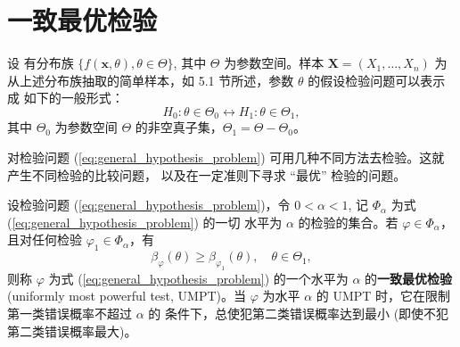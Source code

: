\section{一致最优检验}\label{sec:一致最优检验}
设 有分布族 $\{f(\mathbf{x}, \theta), \theta \in \Theta\}$, 其中 $\Theta$ 为参数空间。样本 $\mathbf{X}=(X_1, \dots, X_n)$ 为
从上述分布族抽取的简单样本，如 5.1 节所述，参数 $\theta$ 的假设检验问题可以表示成
如下的一般形式：
\begin{equation}
H_0: \theta \in \Theta_0 \leftrightarrow H_1: \theta \in \Theta_1, \label{eq:general_hypothesis_problem}
\end{equation}
其中 $\Theta_0$ 为参数空间 $\Theta$ 的非空真子集，$\Theta_1 = \Theta - \Theta_0$。

对检验问题 (\ref{eq:general_hypothesis_problem}) 可用几种不同方法去检验。这就产生不同检验的比较问题，
以及在一定准则下寻求 “最优” 检验的问题。

\begin{definition}\label{def:UMPT}
设检验问题 (\ref{eq:general_hypothesis_problem})，令 $0 < \alpha < 1$, 记 $\Phi_\alpha$ 为式 (\ref{eq:general_hypothesis_problem}) 的一切
水平为 $\alpha$ 的检验的集合。若 $\varphi \in \Phi_\alpha$，且对任何检验 $\varphi_1 \in \Phi_\alpha$，有
\begin{equation}
\beta_\varphi(\theta) \ge \beta_{\varphi_1}(\theta), \quad \theta \in \Theta_1, \label{eq:UMPT_condition}
\end{equation}
则称 $\varphi$ 为式 (\ref{eq:general_hypothesis_problem}) 的一个水平为 $\alpha$ 的\textbf{一致最优检验} (uniformly most powerful
test, UMPT)。当 $\varphi$ 为水平 $\alpha$ 的 UMPT 时，它在限制第一类错误概率不超过 $\alpha$ 的
条件下，总使犯第二类错误概率达到最小 (即使不犯第二类错误概率最大)。
\end{definition}


